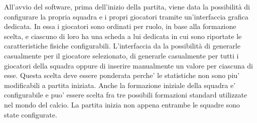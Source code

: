 All'avvio del software, prima dell'inizio della partita, viene data la possibilit\`{a} di configurare la propria squadra e i propri giocatori tramite un'interfaccia grafica dedicata. In essa i giocatori sono ordinati per ruolo, in base alla formazione scelta, e ciascuno di loro ha una scheda a lui dedicata in cui sono riportate le caratteristiche fisiche configurabili. L'interfaccia da la possibilit\`{a} di generarle casualmente per il giocatore selezionato, di generarle casualmente per tutti i giocatori della squadra oppure di inserire manualmente un valore per ciascuna di esse. Questa scelta deve essere ponderata perche' le statistiche non sono piu' modificabili a partita iniziata. Anche la formazione iniziale della squadra e' configurabile e puo' essere scelta fra tre possibili formazioni standard utilizzate nel mondo del calcio. La partita inizia non appena entrambe le squadre sono state configurate.
